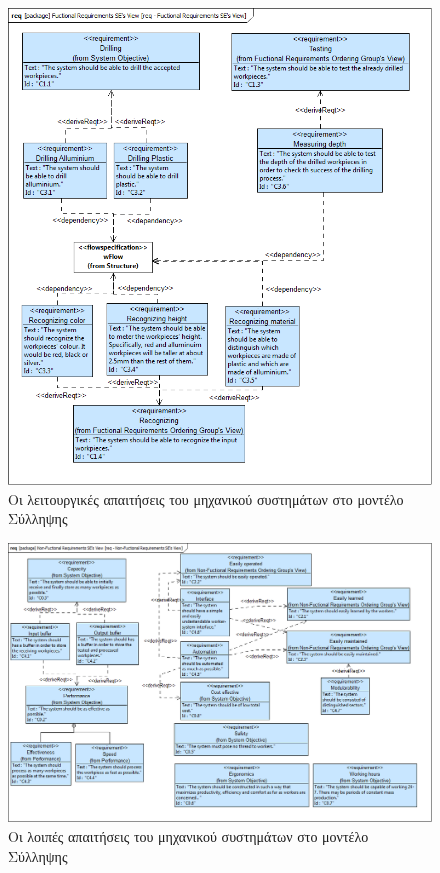 \documentclass[a4paper,12pt,twoside]{report}
\begin{document}
\begin{appendices}
				\begin{figure}[hp]
					\centering
					\includegraphics[scale=0.45]{ConceptionalModel_req-FuctionalRequirementsSEsView.png}
					\caption{Οι λειτουργικές απαιτήσεις του μηχανικού συστημάτων στο μοντέλο Σύλληψης}
					\label{φωτ:Οι λειτουργικές απαιτήσεις του μηχανικού συστημάτων στο μοντέλο Σύλληψης}
				\end{figure}
				
				\begin{figure}[hp]
					\centering
					\includegraphics[scale=0.30]{ConceptionalModel_req-Non-FuctionalRequirementsSEsView.png}
					\caption{Οι λοιπές απαιτήσεις του μηχανικού συστημάτων στο μοντέλο Σύλληψης}
					\label{φωτ:Οι λοιπές απαιτήσεις του μηχανικού συστημάτων στο μοντέλο Σύλληψης}
				\end{figure}
			

\end{appendices}
\end{document}
